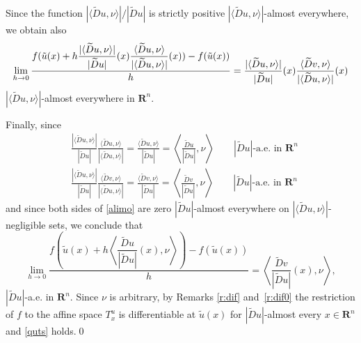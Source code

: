 \documentclass[draft]{amsart}
\theoremstyle{definition}
\theoremstyle{remark}
\begin{document}
Since the function $|\langle \widetilde{D}u,\nu\rangle |/|\widetilde{D}u|$
is strictly positive $|\langle \widetilde{D}u,\nu\rangle |$-almost everywhere,
we obtain also
\[
\lim_{h\to 0}\frac{f(\tilde u(x)+h\dfrac{|\langle
\widetilde{D}u,\nu\rangle |}{|\widetilde{D}u|}(x)\dfrac{\langle \widetilde{D}
u,\nu\rangle }{|\langle \widetilde{D}u,\nu\rangle |}(x))-f(\tilde u(x))}{h}\\
=\frac{|\langle \widetilde{D}u,\nu\rangle |}{|\widetilde{D}u|}(x)\frac
{\langle \widetilde{D}v,\nu\rangle }{|\langle
\widetilde{D}u,\nu\rangle |}(x)
\]
$|\langle \widetilde{D}u,\nu\rangle |$-almost everywhere in $\mathbf{R}^n$.

Finally, since
\begin{align*}
&\frac{|\langle \widetilde{D}u,\nu\rangle |}{|\widetilde{D}u|}
\frac{\langle \widetilde{D}u,\nu\rangle }{|\langle \widetilde{D}u,\nu\rangle|}
=\frac{\langle \widetilde{D}u,\nu\rangle }{|\widetilde{D}u|}
=\left\langle \frac{\widetilde{D}u}{|\widetilde{D}u|},\nu\right\rangle
        \qquad|\widetilde{D}u|\text{-a.e. in }\mathbf{R}^n\\
&\frac{|\langle \widetilde{D}u,\nu\rangle |}{|\widetilde{D}u|}
\frac{\langle \widetilde{D}v,\nu\rangle }{|\langle \widetilde{D}u,\nu\rangle|}
=\frac{\langle \widetilde{D}v,\nu\rangle }{|\widetilde{D}u|}
=\left\langle \frac{\widetilde{D}v}{|\widetilde{D}u|},\nu\right\rangle
        \qquad|\widetilde{D}u|\text{-a.e. in }\mathbf{R}^n
\end{align*}
and since both sides of \eqref{alimo}
are zero $|\widetilde{D}u|$-almost everywhere
on $|\langle \widetilde{D}u,\nu\rangle |$-negligible sets, we conclude that
\[
\lim_{h\to 0}\frac{f\left(
\tilde u(x)+h\left\langle \dfrac{\widetilde{D}
u}{|\widetilde{D}u|}(x),\nu\right\rangle \right)-f(\tilde u(x))}h
=\left\langle \frac{\widetilde{D}v}{|\widetilde{D}u|}(x),\nu\right\rangle,
\]
$|\widetilde{D}u|$-a.e. in $\mathbf{R}^n$.
Since $\nu$ is arbitrary, by Remarks \ref{r:dif} and~\ref{r:dif0}
the restriction of $f$ to
the affine space $T^u_x$ is differentiable at $\tilde u(x)$ for $|\widetilde{D}
u|$-almost every $x\in \mathbf{R}^n$ and \eqref{quts} holds.\qed
\end{document}
